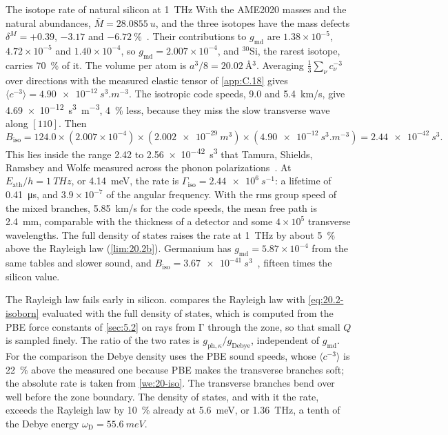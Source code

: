 \begin{workedexample}{The isotope rate of natural silicon at \SI{1}{THz}}\label{we:20-iso}
With the AME2020 masses and the natural abundances, $\bar M = \SI{28.0855}{u}$, and the three isotopes have the mass defects $\delta^M = +0.39$, $-3.17$ and $\SI{-6.72}{\percent}$~\cite{wang2021ame2020,meija2016isotopic}. Their contributions to $g_{\mathrm{md}}$ are $1.38\times10^{-5}$, $4.72\times10^{-5}$ and $1.40\times10^{-4}$, so $g_{\mathrm{md}} = 2.007\times10^{-4}$, and $^{30}$Si, the rarest isotope, carries \SI{70}{\percent} of it. The volume per atom is $a^3/8 = \SI{20.02}{\angstrom^3}$. Averaging $\frac13\sum_\nu c_\nu^{-3}$ over directions with the measured elastic tensor of \cref{app:C.18} gives $\langle c^{-3}\rangle = \SI{4.90e-12}{s^3.m^{-3}}$. The isotropic code speeds, 9.0 and \SI{5.4}{km/s}, give \SI{4.69e-12}{s^3.m^{-3}}, \SI{4}{\percent} less, because they miss the slow transverse wave along $[110]$. Then
\begin{equation*}
  B_{\mathrm{iso}} = 124.0\times(2.007\times10^{-4})\times(\SI{2.002e-29}{m^3})\times(\SI{4.90e-12}{s^3.m^{-3}}) = \SI{2.44e-42}{s^3} .
\end{equation*}
This lies inside the range 2.42 to \SI{2.56e-42}{s^3} that Tamura, Shields, Ramsbey and Wolfe measured across the phonon polarizations~\cite[Table~4]{hernandez2025modeling}. At $E_{\mathrm{ath}}/h = \SI{1}{THz}$, or \SI{4.14}{meV}, the rate is $\varGamma_{\mathrm{iso}} = \SI{2.44e6}{s^{-1}}$: a lifetime of \SI{0.41}{\micro s}, and $3.9\times10^{-7}$ of the angular frequency. With the rms group speed of the mixed branches, \SI{5.85}{km/s} for the code speeds, the mean free path is \SI{2.4}{mm}, comparable with the thickness of a detector and some $4\times10^5$ transverse wavelengths. The full density of states raises the rate at \SI{1}{THz} by about \SI{5}{\percent} above the Rayleigh law (\cref{lim:20.2b}). Germanium has $g_{\mathrm{md}} = 5.87\times10^{-4}$ from the same tables and slower sound, and $B_{\mathrm{iso}} = \SI{3.67e-41}{s^3}$~\cite[Table~I]{leman2012invited}, fifteen times the silicon value.
\end{workedexample}

The Rayleigh law fails early in silicon.  compares the Rayleigh law with \cref{eq:20.2-isoborn} evaluated with the full density of states, which is computed from the PBE force constants of \cref{sec:5.2} on rays from $\mathrm{\Gamma}$ through the zone, so that small $Q$ is sampled finely. The ratio of the two rates is $g_{\mathrm{ph},\kappa}/g_{\mathrm{Debye}}$, independent of $g_{\mathrm{md}}$. For the comparison the Debye density uses the PBE sound speeds, whose $\langle c^{-3}\rangle$ is \SI{22}{\percent} above the measured one because PBE makes the transverse branches soft; the absolute rate is taken from \cref{we:20-iso}. The transverse branches bend over well before the zone boundary. The density of states, and with it the rate, exceeds the Rayleigh law by \SI{10}{\percent} already at \SI{5.6}{meV}, or \SI{1.36}{THz}, a tenth of the Debye energy $\omega_{\mathrm{D}} = \SI{55.6}{meV}$.

